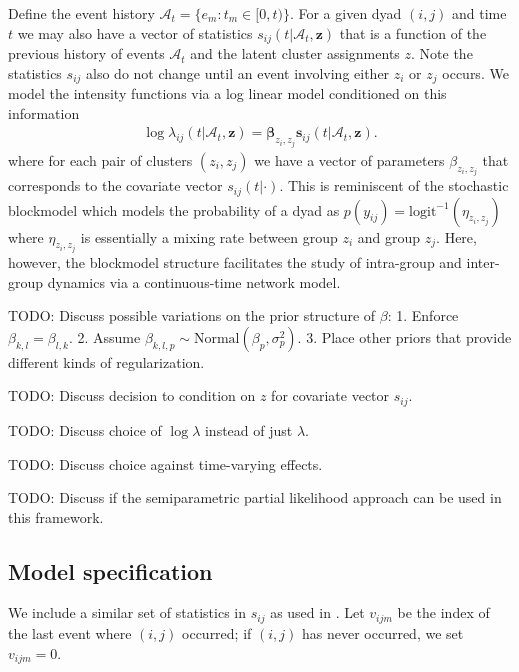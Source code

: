 \documentclass[11pt]{article}
\begin{document}
Define the event history $\mathcal{A}_t = \{e_m: t_m \in [0,t)\}$.
For a given dyad $(i,j)$ and time $t$ we may also have a vector of statistics $s_{ij}(t|\mathcal{A}_t,\mathbf{z})$ that is a function of the previous history of events $\mathcal{A}_t$ and the latent cluster assignments $z$.  Note the statistics $s_{ij}$ also do not change until an event involving either $z_i$ or $z_j$ occurs.  We model the intensity functions via a log linear model conditioned on this information
\begin{align}
\log \lambda_{ij}(t | \mathcal{A}_t,\mathbf{z}) = \boldsymbol{\beta}_{z_i,z_j} \mathbf{s}_{ij}(t|\mathcal{A}_t,\mathbf{z}).
\end{align}
where for each pair of clusters $(z_i,z_j)$ we have a vector of parameters $\beta_{z_i,z_j}$ that corresponds to the covariate vector $s_{ij}(t|\cdot)$.  This is reminiscent of the stochastic blockmodel \cite{Nowicki2001, Kemp2006} which models the probability of a dyad as $p(y_{ij}) =\mbox{logit}^{-1}( \eta_{z_i,z_j})$ where $\eta_{z_i,z_j}$ is essentially a mixing rate between group $z_i$ and group $z_j$.  Here, however, the blockmodel structure facilitates the study of intra-group and inter-group dynamics via a continuous-time network model.

TODO: Discuss possible variations on the prior structure of $\beta$: 1. Enforce $\beta_{k,l} = \beta_{l,k}$. 2. Assume $\beta_{k,l,p} \sim \mbox{Normal}(\beta_p,\sigma_p^2)$. 3. Place other priors that provide different kinds of regularization. 

TODO: Discuss decision to condition on $z$ for covariate vector $s_{ij}$.

TODO: Discuss choice of $\log \lambda$ instead of just $\lambda$.

TODO: Discuss choice against time-varying effects.

TODO: Discuss if the semiparametric partial likelihood approach can be used in this framework.

\subsection{Model specification}

We include a similar set of statistics in $s_{ij}$ as used in \cite{Butts2008,Vuy2011}.  Let $v_{ijm}$ be the index of the last event where $(i,j)$ occurred; if $(i,j)$ has never occurred, we set $v_{ijm}=0$.
\end{document}
